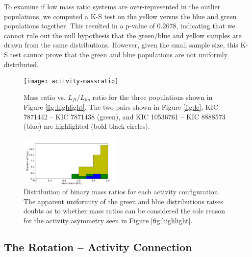 \documentclass[preprint2]{aastex61}
\begin{document}
To examine if low mass ratio systems are over-represented in the outlier populations, we computed a K-S test on the yellow versus the blue and green populations together. This resulted in a p-value of 0.2678, indicating that we cannot rule out the null hypothesis that the green/blue and yellow samples are drawn from the same distributions. However, given the small sample size, this K-S test cannot prove that the green and blue populations are not uniformly distributed.

\begin{figure}[!t]
\centering
\texttt{[image: activity-massratio]}
\caption{Mass ratio vs. $L_{fl}/L_{kp}$ ratio for the three populations shown in Figure \ref{fig:highlight}. The two pairs shown in Figure \ref{fig:lc}, KIC 7871442 -- KIC 7871438 (green), and KIC 10536761 -- KIC 8888573 (blue) are highlighted (bold black circles).
}
\label{fig:massplot}
\end{figure}

\begin{figure}[!t]
\centering
\includegraphics[width=0.45\textwidth]{MassHist}
\caption{Distribution of binary mass ratios for each activity configuration. The apparent uniformity of the green and blue distributions raises doubts as to whether mass ratios can be considered the sole reason for the activity asymmetry seen in Figure \ref{fig:highlight}.
}
\label{fig:massdist}
\end{figure}

\subsection{The Rotation -- Activity Connection}
\end{document}
